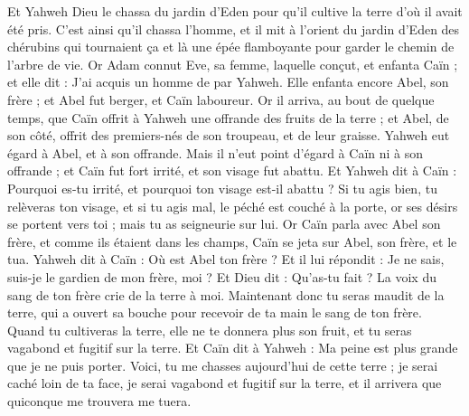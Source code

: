 \begin{multicols}{2}
Et Yahweh Dieu le chassa du jardin d'Eden pour qu'il cultive la terre d'où il avait été pris.
C'est ainsi qu'il chassa l'homme, et il mit à l'orient du jardin d'Eden des chérubins qui tournaient ça et là une épée flamboyante pour garder le chemin de l'arbre de vie.
\VerseOne{}Or Adam connut Eve, sa femme, laquelle conçut, et enfanta Caïn ; et elle dit : J'ai acquis un homme de par Yahweh.
Elle enfanta encore Abel, son frère ; et Abel fut berger, et Caïn laboureur.
Or il arriva, au bout de quelque temps, que Caïn offrit à Yahweh une offrande des fruits de la terre ;
et Abel, de son côté, offrit des premiers-nés de son troupeau, et de leur graisse. Yahweh eut égard à Abel, et à son offrande.
Mais il n'eut point d'égard à Caïn ni à son offrande ; et Caïn fut fort irrité, et son visage fut abattu.
Et Yahweh dit à Caïn : Pourquoi es-tu irrité, et pourquoi ton visage est-il abattu ?
Si tu agis bien, tu relèveras ton visage, et si tu agis mal, le péché est couché à la porte, or ses désirs se portent vers toi ; mais tu as seigneurie sur lui.
Or Caïn parla avec Abel son frère, et comme ils étaient dans les champs, Caïn se jeta sur Abel, son frère, et le tua.
Yahweh dit à Caïn : Où est Abel ton frère ? Et il lui répondit : Je ne sais, suis-je le gardien de mon frère, moi ?
Et Dieu dit : Qu'as-tu fait ? La voix du sang de ton frère crie de la terre à moi.
Maintenant donc tu seras maudit de la terre, qui a ouvert sa bouche pour recevoir de ta main le sang de ton frère.
Quand tu cultiveras la terre, elle ne te donnera plus son fruit, et tu seras vagabond et fugitif sur la terre.
Et Caïn dit à Yahweh : Ma peine est plus grande que je ne puis porter.
Voici, tu me chasses aujourd'hui de cette terre ; je serai caché loin de ta face, je serai vagabond et fugitif sur la terre, et il arrivera que quiconque me trouvera me tuera.

\end{multicols}
